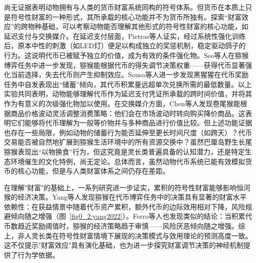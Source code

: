 尚无证据表明动物拥有与人类的货币财富系统同构的符号体系。但货币在本质上只是符号性财富的一种形式，其所承载的核心功能并不为货币所独有。探索“财富效应”的跨物种基础，可以考察动物能否理解其他形式的符号性财富的核心功能，如延迟支付与交换媒介\cite{addessi2020roots,beran2021primate}。在延迟支付层面，Pietras等人证实，经过系统性强化训练后，原本中性的刺激（如LED灯）便足以构成独立的奖惩机制，稳定驱动鸽子的行为\cite{pietras2005punishment}。这说明代币已被赋予独立的价值，成为有效的条件强化物。Seo等人在猕猴博弈任务中进一步发现，猕猴能根据代币的得失调节决策权重——获得代币显著强化当前选择，失去代币则产生抑制效应\cite{seo2009behavioral}。Sousa等人进一步发现黑猩猩在代币奖励任务中自发表现出“储蓄”倾向，其代币积累量远超单次兑换所需的最低数量\cite{sousa2001use}。以上实验共同表明，动物能够理解代币作为延迟支付凭证所承载的跨时间价值，并将其作为有意义的次级强化物加以使用。在交换媒介方面，Chen等人发现卷尾猴能根据商品价格波动灵活调整消费策略：他们会在市场波动时转向购买降价商品\cite{chen2006basic}。这表明它们能够将代币理解为一般等价物并与多种商品进行价值比较。但上述功能证据也存在一些局限，例如动物的储蓄行为能否延伸至更长时间尺度（如跨天）？代币交易能否被自然地扩展到猕猴生活环境中的所有资源交换中？虽然巴厘岛野生长尾猕猴表现出“以物换食”行为\cite{leca2021acquisition}，但这究竟是灵长类普遍具备的认知潜力，还是特定生态环境催生的文化特例，尚无定论。总体而言，虽然动物代币系统已能有效模拟货币的核心功能，但是与人类财富体系之间仍存在差距。

在理解"财富"的基础上，一系列研究进一步证实，累积的符号性财富能够影响恒河猴的经济决策。Yang等人发现猕猴在代币博弈任务中的决策具有显著的财富水平依赖性：在获益情景中随着代币资产累积，额外代币的边际效用相对下降，风险规避倾向随之增强（图~\ref{fig0_2:yang2022}）\cite{yang2022primate}。Ferro等人也发现类似的结论：当积累代币数趋近奖励阈值时，猕猴的经济策略趋于审慎——风险厌恶倾向随之增强\cite{ferro2026accumulation}。综上，非人灵长类在符号性财富情境下展现的决策模式与效用理论的预测高度一致。这不仅提示"财富效应"具有演化基础，也为进一步探究财富调节决策的神经机制提供了行为学依据。

